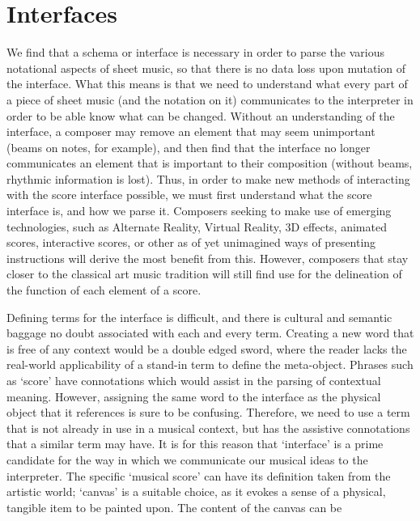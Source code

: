 \section{Interfaces}
We find that a schema or interface is necessary in order to parse the various notational aspects of sheet music, so that there is no data loss upon mutation of the interface.
What this means is that we need to understand what every part of a piece of sheet music (and the notation on it) communicates to the interpreter in order to be able know what can be changed.
Without an understanding of the interface, a composer may remove an element that may seem unimportant (beams on notes, for example), and then find that the interface no longer communicates an element that is important to their composition (without beams, rhythmic information is lost).
Thus, in order to make new methods of interacting with the score interface possible, we must first understand what the score interface is, and how we parse it.
Composers seeking to make use of emerging technologies, such as Alternate Reality, Virtual Reality, 3D effects, animated scores, interactive scores, or other as of yet unimagined ways of presenting instructions will derive the most benefit from this.
However, composers that stay closer to the classical art music tradition will still find use for the delineation of the function of each element of a score.

Defining terms for the interface is difficult, and there is cultural and semantic baggage no doubt associated with each and every term.
Creating a new word that is free of any context would be a double edged sword, where the reader lacks the real-world applicability of a stand-in term to define the meta-object.
Phrases such as `score' have connotations which would assist in the parsing of contextual meaning. 
However, assigning the same word to the interface as the physical object that it references is sure to be confusing.
Therefore, we need to use a term that is not already in use in a musical context, but has the assistive connotations that a similar term may have. 
It is for this reason that `interface' is a prime candidate for the way in which we communicate our musical ideas to the interpreter. 
The specific `musical score' can have its definition taken from the artistic world; `canvas' is a suitable choice, as it evokes a sense of a physical, tangible item to be painted upon.
The content of the canvas can be 